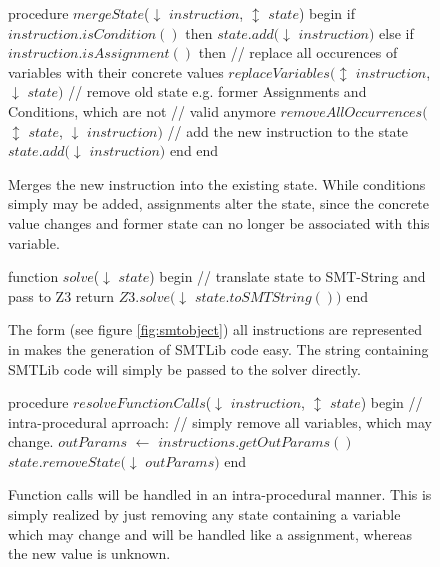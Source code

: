\begin{figure}[h!]
	\begin{GenericCode}
	procedure $mergeState$($\downarrow$ $instruction$, $\updownarrow$ $state$) begin
		if $instruction.isCondition()$ then
			$state.add($$\downarrow$ $instruction$$)$
		else if $instruction.isAssignment()$ then
			// replace all occurences of variables with their concrete values
			$replaceVariables($$\updownarrow$ $instruction$, $\downarrow$ $state$$)$ 
			// remove old state e.g. former Assignments and Conditions, which are not
			// valid anymore
			$removeAllOccurrences($$\updownarrow$ $state$, $\downarrow$ $instruction$$)$
			// add the new instruction to the state
			$state.add($$\downarrow$ $instruction$$)$
		end 
	end		
	\end{GenericCode}
	\caption{Merges the new instruction into the existing state. While conditions simply may be added, assignments alter the state, since the concrete value changes and former state can no longer be associated with this variable. }
\label{code:merge state}
\end{figure}
\begin{figure}[h!]
	\begin{GenericCode}
	function $solve$($\downarrow$ $state$) begin
		// translate state to SMT-String and pass to Z3
		return $Z3.solve($$\downarrow$ $state.toSMTString())$
	end
	\end{GenericCode}
	\caption{The form (see figure \ref{fig:smtobject}) all instructions are represented in makes the generation of SMTLib code easy. The string containing SMTLib code will simply be passed to the solver directly.}
\label{code:z3 solver}
\end{figure}
\begin{figure}[h!]
	\begin{GenericCode}
	procedure $resolveFunctionCalls$($\downarrow$ $instruction$, $\updownarrow$ $state$) begin
		// intra-procedural aprroach:
		// simply remove all variables, which may change.
		$outParams$ $\leftarrow$ $instructions.getOutParams()$
		$state.removeState($$\downarrow$ $outParams$$)$
	end		
	\end{GenericCode}
	\caption{Function calls will be handled in an intra-procedural manner. This is simply realized by just removing any state containing a variable which may change and will be handled like a assignment, whereas the new value is unknown. }
	\label{code:intraprocedural analysis}
\end{figure}
